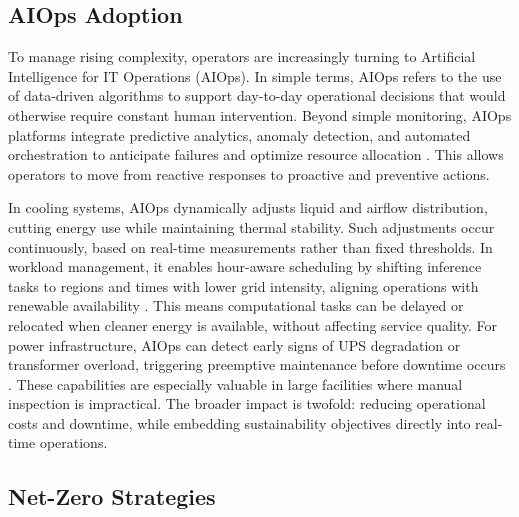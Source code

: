 \documentclass[conference]{IEEEtran}
\begin{document}
\subsection{AIOps Adoption}

To manage rising complexity, operators are increasingly turning to Artificial Intelligence for IT Operations (AIOps). In simple terms, AIOps refers to the use of data-driven algorithms to support day-to-day operational decisions that would otherwise require constant human intervention. Beyond simple monitoring, AIOps platforms integrate predictive analytics, anomaly detection, and automated orchestration to anticipate failures and optimize resource allocation \cite{Zakarya2024}. This allows operators to move from reactive responses to proactive and preventive actions.

In cooling systems, AIOps dynamically adjusts liquid and airflow distribution, cutting energy use while maintaining thermal stability. Such adjustments occur continuously, based on real-time measurements rather than fixed thresholds. In workload management, it enables hour-aware scheduling by shifting inference tasks to regions and times with lower grid intensity, aligning operations with renewable availability \cite{Zakarya2024}. This means computational tasks can be delayed or relocated when cleaner energy is available, without affecting service quality. For power infrastructure, AIOps can detect early signs of UPS degradation or transformer overload, triggering preemptive maintenance before downtime occurs \cite{Zakarya2024}. These capabilities are especially valuable in large facilities where manual inspection is impractical. The broader impact is twofold: reducing operational costs and downtime, while embedding sustainability objectives directly into real-time operations.

\subsection{Net-Zero Strategies}
\end{document}
